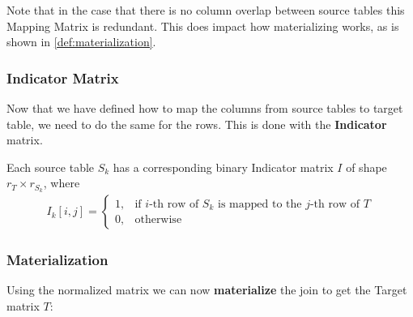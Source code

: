 Note that in the case that there is no column overlap between source tables this Mapping Matrix is redundant. This does impact how materializing works, as is shown in \autoref{def:materialization}.


\subsubsection{Indicator Matrix}
Now that we have defined how to map the columns from source tables to target table, we need to do the same for the rows. This is done with the \textbf{Indicator} matrix.

\begin{definition}
    Each source table $S_k$ has a corresponding binary Indicator matrix $I$ of shape $r_T \times r_{S_k}$, where
    \begin{align*}
        I_k[i,j] = \begin{cases}
                       1, & \text{if $i$-th row of $S_k$ is mapped to the $j$-th row of $T$} \\
                       0, & \text{otherwise}
                   \end{cases}
    \end{align*}
\end{definition}



\subsubsection{Materialization}
Using the normalized matrix we can now \textbf{materialize} the join to get the Target matrix $T$:


